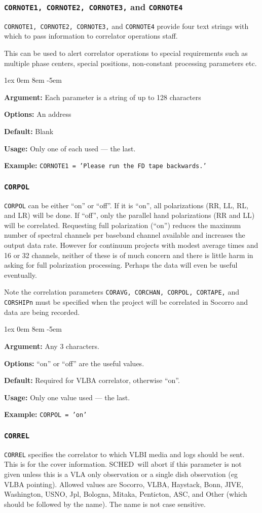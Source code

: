 \documentclass{report}
\newcommand{\schedb}{{\sc SCHED~}}
\newcommand{\rcwbox}[5]{
  \begin{list}{}{\parsep 1ex  \itemsep 0em
                 \leftmargin 8em  \itemindent -5em }
    \item {\bf Argument:} #1
    \item {\bf Options:}  #2
    \item {\bf Default:}  #3
    \item {\bf Usage:}    #4
    \item {\bf Example:}  #5
  \end{list}
}
\begin{document}
\subsubsection{\label{MP:CORNOTE}
{\tt CORNOTE1, CORNOTE2, CORNOTE3,} and {\tt CORNOTE4}}

{\tt CORNOTE1, CORNOTE2, CORNOTE3,} and {\tt CORNOTE4} provide four
text strings with which to pass information to correlator operations
staff.

This can be used to alert correlator operations to special
requirements such as multiple phase centers, special positions,
non-constant processing parameters etc.

\rcwbox
{Each parameter is a string of up to 128 characters}
{An address}
{Blank}
{Only one of each used --- the last.}
{{\tt CORNOTE1 = 'Please run the FD tape backwards.' }}


\subsubsection{\label{MP:CORPOL}{\tt CORPOL}}

{\tt CORPOL} can be either ``on'' or ``off''.  If it is ``on'',
all polarizations (RR, LL, RL, and LR) will be done.  If ``off'',
only the parallel hand polarizations (RR and LL) will be correlated.
Requesting full polarization (``on'') reduces the maximum number
of spectral channels per baseband channel available and increases
the output data rate.  However for continuum projects with modest
average times and 16 or 32 channels, neither of these is of much
concern and there is little harm in asking for full polarization
processing.  Perhaps the data will even be useful eventually.

Note the correlation parameters {\tt CORAVG, CORCHAN,
CORPOL, CORTAPE,} and {\tt CORSHIPn} must be specified when
the project will be correlated in Socorro and data
are being recorded.

\rcwbox
{Any 3 characters.}
{``on'' or ``off'' are the useful values.}
{Required for VLBA correlator, otherwise ``on''.}
{Only one value used --- the last.}
{{\tt CORPOL = 'on'}}

\subsubsection{\label{MP:CORREL}{\tt CORREL}}

{\tt CORREL} specifies the correlator to which VLBI media and logs
should be sent. This is for the cover information.  \schedb will abort
if this parameter is not given unless this is a VLA only observation
or a single dish observation (eg VLBA pointing).  Allowed values are
Socorro, VLBA, Haystack, Bonn, JIVE, Washington, USNO, Jpl, Bologna,
Mitaka, Penticton, ASC,  and Other (which should be followed by the name).
The name is not case sensitive.
\end{document}
